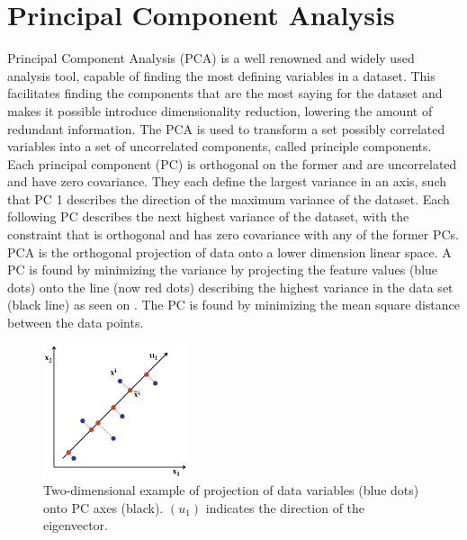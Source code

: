

\section{Principal Component Analysis}

Principal Component Analysis (PCA) is a well renowned and widely used analysis tool, capable of finding the most defining variables in a dataset. This facilitates finding the components that are the most saying for the dataset and makes it possible introduce dimensionality reduction, lowering the amount of redundant information. The PCA is used to transform a set possibly correlated variables into a set of uncorrelated components, called principle components. Each principal component (PC) is
orthogonal on the former and are uncorrelated and have zero covariance. They each define the largest
variance in an axis, such that PC 1 describes the direction of the maximum variance of the dataset. Each
following PC describes the next highest variance of the dataset, with the constraint that is orthogonal
and has zero covariance with any of the former PCs. PCA is the orthogonal projection of data onto a
lower dimension linear space.  A PC is found by minimizing the variance by projecting the feature values (blue dots) onto the line (now red dots) describing the highest variance in the data set (black line) as seen on . The PC is found by minimizing the mean square distance between the data points. \cite{Jolliffe1986}

\begin{figure}[H] 
	\includegraphics[width=0.38\textwidth]{figures/aBackground/projection}
	\caption{Two-dimensional example of projection of data variables (blue dots) onto PC axes (black). $(u_1)$ indicates the direction of the eigenvector. \cite{PCA2018}}
	\label{projection}
\end{figure}

